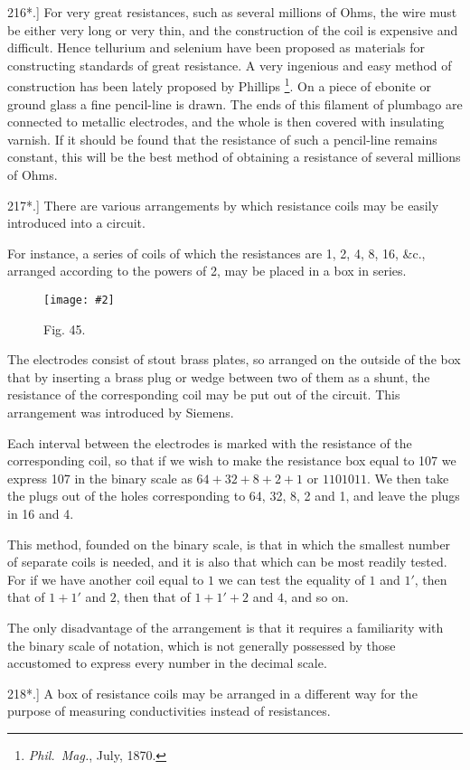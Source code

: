 \documentclass[12pt,oneside]{book}[2021/10/04]
\let\oldfootnote\footnote
\renewcommand\footnote[1]{%
\oldfootnote{\hspace{0.14em}#1}}
\newcommand{\Runhead}[1]{\fancyhead[C]{\iffloatpage{}{\small#1}}}
\newcommand{\article}[1]{\phantomsection \label{art:#1}{#1.]}}
\newcommand{\widefig}[3]{
\begin{figure}[ht!]
\centering
\texttt{[image: \#2]}
\caption*{\small #3}
\end{figure}}
\newcommand{\¬}{\hphantom{0}}
\begin{document}
\article{216*} For very great resistances, such as several millions of
Ohms, the wire must be either very long or very thin, and the
construction of the coil is expensive and difficult. Hence tellurium
and selenium have been proposed as materials for constructing
standards of great resistance. A very ingenious and easy method
of construction has been lately proposed by Phillips\footnote{
\textit{Phil.\ Mag.}, July, 1870.}. On a piece
of ebonite or ground glass a fine pencil-line is drawn. The ends
of this filament of plumbago are connected to metallic electrodes,
and the whole is then covered with insulating varnish. If it
should be found that the resistance of such a pencil-line remains
constant, this will be the best method of obtaining a resistance of
several millions of Ohms.

\article{217*} There are various arrangements by which resistance coils
may be easily introduced into a circuit.

For instance, a series of coils of which the resistances are 1, 2,
4, 8, 16, \&c., arranged according to the powers of 2, may be placed
in a box in series.

\widefig{0.6}{198.png}{Fig. 45.}
The electrodes consist of stout brass plates, so arranged on the
outside of the box that by inserting a brass plug or wedge between
two of them as a shunt, the resistance of the corresponding coil
may be put out of the circuit. This arrangement was introduced
by Siemens.
\Runhead{RESISTANCE BOXES.}

Each interval between the electrodes is marked with the resistance
of the corresponding coil, so that if we wish to make the
resistance box equal to 107 we express 107 in the binary scale as
\(64 + 32 + 8 + 2 + 1\) or \(1101011\). We then take the plugs out of
the holes corresponding to 64, 32, 8, 2 and 1, and leave the plugs
in 16 and 4.

This method, founded on the binary scale, is that in which the
smallest number of separate coils is needed, and it is also that
which can be most readily tested. For if we have another coil
equal to \(1\) we can test the equality of \(1\) and \(1'\), then that of \(1 + 1'\)
and \(2\), then that of \(1 + 1' + 2\) and \(4\), and so on.

The only disadvantage of the arrangement is that it requires
a familiarity with the binary scale of notation, which is not
generally possessed by those accustomed to express every number
in the decimal scale.

\article{218*} A box of resistance coils may be arranged in a different
way for the purpose of measuring
conductivities instead of
resistances.
\end{document}
